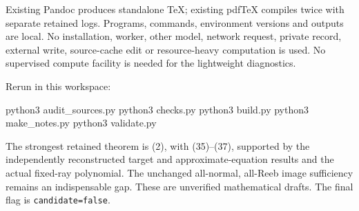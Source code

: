 \documentclass[
  10pt,
]{article}
\newenvironment{Shaded}{}{}
\newcommand{\ExtensionTok}[1]{#1}
\newcommand{\NormalTok}[1]{#1}
\begin{document}
Existing Pandoc produces standalone TeX; existing pdfTeX compiles twice
with separate retained logs. Programs, commands, environment versions
and outputs are local. No installation, worker, other model, network
request, private record, external write, source-cache edit or
resource-heavy computation is used. No supervised compute facility is
needed for the lightweight diagnostics.

Rerun in this workspace:

\begin{Shaded}
\begin{Highlighting}[]
\ExtensionTok{python3}\NormalTok{ audit\_sources.py}
\ExtensionTok{python3}\NormalTok{ checks.py}
\ExtensionTok{python3}\NormalTok{ build.py}
\ExtensionTok{python3}\NormalTok{ make\_notes.py}
\ExtensionTok{python3}\NormalTok{ validate.py}
\end{Highlighting}
\end{Shaded}

The strongest retained theorem is (2), with (35)--(37), supported by the
independently reconstructed target and approximate-equation results and
the actual fixed-ray polynomial. The unchanged all-normal, all-Reeb
image sufficiency remains an indispensable gap. These are unverified
mathematical drafts. The final flag is \texttt{candidate=false}.
\end{document}

